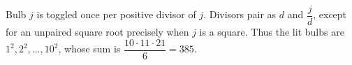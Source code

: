 Bulb $j$ is toggled once per positive divisor of $j$. Divisors pair as $d$ and $\dfrac{j}{d}$, except for an unpaired square root precisely when $j$ is a square. Thus the lit bulbs are $1^2,2^2,\ldots,10^2$, whose sum is $\dfrac{10\cdot11\cdot21}{6}=\boxed{385}$.
